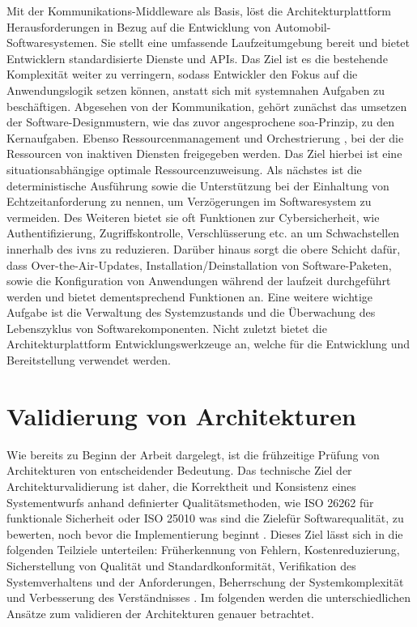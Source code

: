 Mit der Kommunikations-Middleware als Basis, löst die Architekturplattform Herausforderungen in Bezug auf die Entwicklung von Automobil-Softwaresystemen. Sie stellt eine umfassende Laufzeitumgebung bereit und bietet Entwicklern standardisierte Dienste und APIs. Das Ziel ist es die bestehende Komplexität weiter zu verringern, sodass Entwickler den Fokus auf die Anwendungslogik setzen können, anstatt sich mit systemnahen Aufgaben zu beschäftigen. Abgesehen von der Kommunikation, gehört zunächst das umsetzen der Software-Designmustern, wie das zuvor angesprochene \gls{soa}-Prinzip, zu den Kernaufgaben. Ebenso Ressourcenmanagement und Orchestrierung , bei der die Ressourcen von inaktiven Diensten freigegeben werden. Das Ziel hierbei ist eine situationsabhängige optimale Ressourcenzuweisung. Als nächstes ist die deterministische Ausführung sowie die Unterstützung bei der Einhaltung von Echtzeitanforderung zu nennen, um Verzögerungen im Softwaresystem zu vermeiden. Des Weiteren bietet sie oft Funktionen zur Cybersicherheit, wie Authentifizierung, Zugriffskontrolle, Verschlüsserung etc. an um Schwachstellen innerhalb des \glspl{ivn} zu reduzieren. Darüber hinaus sorgt die obere Schicht dafür, dass Over-the-Air-Updates, Installation/Deinstallation von Software-Paketen, sowie die Konfiguration von Anwendungen während der laufzeit durchgeführt werden und bietet dementsprechend Funktionen an. Eine weitere wichtige Aufgabe ist die Verwaltung des Systemzustands und die Überwachung des Lebenszyklus von Softwarekomponenten. Nicht zuletzt bietet die Architekturplattform Entwicklungswerkzeuge an, welche für die Entwicklung und Bereitstellung verwendet werden.

\section{Validierung von Architekturen}
\label{sect:validerung}

Wie bereits zu Beginn der Arbeit dargelegt, ist die frühzeitige Prüfung von Architekturen von entscheidender Bedeutung. Das technische Ziel der Architekturvalidierung ist daher, die Korrektheit und Konsistenz eines Systementwurfs anhand definierter Qualitätsmethoden, wie  ISO 26262 für funktionale Sicherheit oder ISO 25010 was sind die Zielefür Softwarequalität, zu bewerten, noch bevor die Implementierung beginnt \cite{venkitachalam2015}. Dieses Ziel lässt sich in die folgenden Teilziele unterteilen: Früherkennung von Fehlern, Kostenreduzierung, Sicherstellung von Qualität und Standardkonformität, Verifikation des Systemverhaltens und der Anforderungen, Beherrschung der Systemkomplexität und Verbesserung des Verständnisses\cite{venkitachalam2015} \cite{kang2019formal} \cite{bucher2019crosslayera}.
Im folgenden werden die unterschiedlichen Ansätze zum validieren der Architekturen genauer betrachtet.
